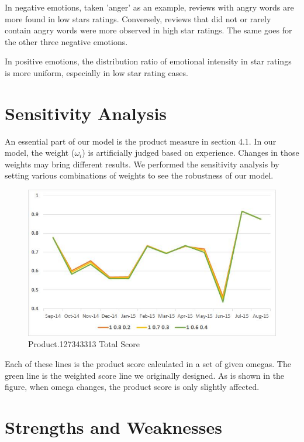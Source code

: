 \documentclass[12pt]{article}  %
\begin{document}
In negative emotions, taken 'anger' as an example, reviews with angry words are more found in low stars ratings. Conversely, reviews that did not or rarely contain angry words were more observed in high star ratings. The same goes for the other three negative emotions.

In positive emotions, the distribution ratio of emotional intensity in star ratings is more uniform, especially in low star rating cases.


\section{Sensitivity Analysis}
An essential part of our model is the product measure in section 4.1. In our model, the weight ($\omega_i$) is artificially judged based on experience. Changes in those weights may bring different results. We performed the sensitivity analysis by setting various combinations of weights to see the robustness of our model.

\begin{figure}[htbp]
	\centering
	\includegraphics[scale=0.7]{13.jpg}
	\caption{Product.127343313 Total Score }\label{fig:fig15}
\end{figure}

Each of these lines is the product score calculated in a set of given omegas. The green line is the weighted score line we originally designed. As is shown in the figure, when omega changes, the product score is only slightly affected.


\section{Strengths and Weaknesses}
\end{document}
